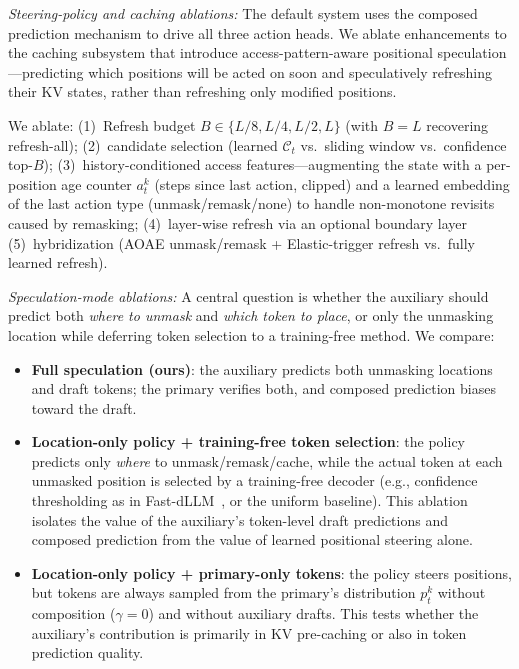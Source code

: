 \documentclass[11pt]{article}
\newcommand{\cC}{\mathcal{C}}
\begin{document}
\emph{Steering-policy and caching ablations:}
The default system uses the composed prediction mechanism to drive all three action heads.
We ablate enhancements to the caching subsystem that introduce access-pattern-aware positional speculation---predicting which positions will be acted on soon and speculatively refreshing their KV states, rather than refreshing only modified positions.

We ablate:
(1)~Refresh budget $B \in \{L/8, L/4, L/2, L\}$ (with $B{=}L$ recovering refresh-all);
(2)~candidate selection (learned $\cC_t$ vs.\ sliding window vs.\ confidence top-$B$);
(3)~history-conditioned access features---augmenting the state with a per-position age counter $a_t^k$ (steps since last action, clipped) and a learned embedding of the last action type (unmask/remask/none) to handle non-monotone revisits caused by remasking;
(4)~layer-wise refresh via an optional boundary layer
(5)~hybridization (AOAE unmask/remask + Elastic-trigger refresh vs.\ fully learned refresh).

\emph{Speculation-mode ablations:}
A central question is whether the auxiliary should predict both \emph{where to unmask} and \emph{which token to place}, or only the unmasking location while deferring token selection to a training-free method.
We compare:
\begin{itemize}[leftmargin=*,itemsep=1pt]
    \item \textbf{Full speculation (ours)}: the auxiliary predicts both unmasking locations and draft tokens; the primary verifies both, and composed prediction biases toward the draft.
    \item \textbf{Location-only policy + training-free token selection}: the policy predicts only \emph{where} to unmask/remask/cache, while the actual token at each unmasked position is selected by a training-free decoder (e.g., confidence thresholding as in Fast-dLLM~\cite{wu2025fastdllm}, or the uniform baseline).
    This ablation isolates the value of the auxiliary's token-level draft predictions and composed prediction from the value of learned positional steering alone.
    \item \textbf{Location-only policy + primary-only tokens}: the policy steers positions, but tokens are always sampled from the primary's distribution $p_t^k$ without composition ($\gamma = 0$) and without auxiliary drafts.
    This tests whether the auxiliary's contribution is primarily in KV pre-caching or also in token prediction quality.
\end{itemize}
\end{document}

